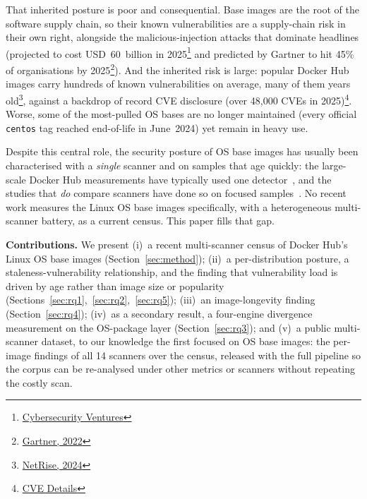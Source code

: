 \documentclass[12pt]{article}
\begin{document}
That inherited posture is poor and consequential. Base images are the root of
the software supply chain, so their known vulnerabilities are a supply-chain
risk in their own right, alongside the malicious-injection attacks that dominate
headlines (projected to cost USD~60~billion in
2025\footnote{\href{https://cybersecurityventures.com/software-supply-chain-attacks-to-cost-the-world-60-billion-by-2025/}{Cybersecurity Ventures}} and predicted by Gartner to hit
45\% of organisations by 2025\footnote{\href{https://www.gartner.com/en/newsroom/press-releases/2022-03-07-gartner-identifies-top-security-and-risk-management-trends-for-2022}{Gartner, 2022}}). And the inherited
risk is large: popular Docker Hub images carry hundreds of known vulnerabilities
on average, many of them years old\footnote{\href{https://www.netrise.io/resources-whitepaper-brief/supply-chain-visibility-risk-study-edition-2}{NetRise, 2024}}, against a backdrop of
record CVE disclosure (over 48{,}000 CVEs in 2025)\footnote{\href{https://www.cvedetails.com/browse-by-date.php}{CVE Details}}. Worse, some of
the most-pulled OS bases are no longer maintained (every official
\texttt{centos} tag reached end-of-life in June~2024) yet remain in heavy
use.

Despite this central role, the security posture of OS base images has usually
been characterised with a \emph{single} scanner and on samples that age
quickly: the large-scale Docker Hub measurements have typically used one
detector~\cite{shu2017dockerhub,zerouali2019outdated,liu2020understanding,shi2025drdocker},
and the studies that \emph{do} compare scanners have done so on focused
samples~\cite{mills2023longitudinal,boles2024deciphering}. No recent work measures
the Linux OS base images specifically, with a heterogeneous multi-scanner
battery, as a current census. This paper fills that gap.

\noindent\textbf{Contributions.} We present (i)~a recent multi-scanner census of
Docker Hub's Linux OS base images (Section~\ref{sec:method}); (ii)~a
per-distribution posture, a staleness-vulnerability relationship, and the
finding that vulnerability load is driven by age rather than image size or
popularity (Sections~\ref{sec:rq1},~\ref{sec:rq2},~\ref{sec:rq5});
(iii)~an image-longevity finding (Section~\ref{sec:rq4}); (iv)~as a secondary
result, a four-engine divergence measurement on the OS-package layer
(Section~\ref{sec:rq3}); and (v)~a public multi-scanner dataset, to our
knowledge the first focused on OS base images: the per-image findings of all 14
scanners over the census, released with the full pipeline so the corpus can be
re-analysed under other metrics or scanners without repeating the costly scan.
\end{document}
